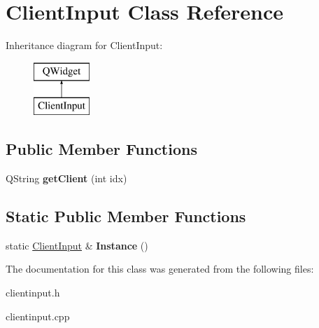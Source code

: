 \hypertarget{class_client_input}{}\section{Client\+Input Class Reference}
\label{class_client_input}
Inheritance diagram for Client\+Input\+:\begin{figure}[H]
\begin{center}
\leavevmode
\includegraphics[height=2.000000cm]{class_client_input}
\end{center}
\end{figure}
\subsection*{Public Member Functions}
\begin{DoxyCompactItemize}
\item 
Q\+String {\bfseries get\+Client} (int idx)\hypertarget{class_client_input_aa86836062c0fa1b6518cc5d2c50d3a3b}{}\label{class_client_input_aa86836062c0fa1b6518cc5d2c50d3a3b}

\end{DoxyCompactItemize}
\subsection*{Static Public Member Functions}
\begin{DoxyCompactItemize}
\item 
static \hyperlink{class_client_input}{Client\+Input} \& {\bfseries Instance} ()\hypertarget{class_client_input_aa09466be48687be61c4f64f3648838e5}{}\label{class_client_input_aa09466be48687be61c4f64f3648838e5}

\end{DoxyCompactItemize}


The documentation for this class was generated from the following files\+:\begin{DoxyCompactItemize}
\item 
clientinput.\+h\item 
clientinput.\+cpp\end{DoxyCompactItemize}
